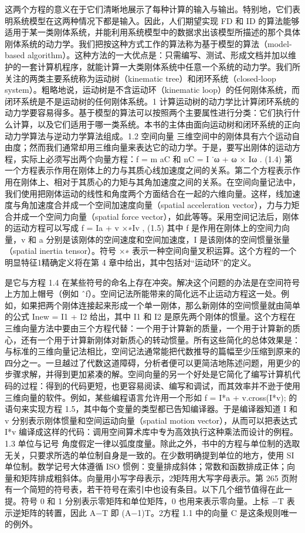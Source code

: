 这两个方程的意义在于它们清晰地展示了每种计算的输入与输出。特别地，它们表明系统模型在这两种情况下都是输入。因此，人们期望实现 FD 和 ID 的算法能够适用于某一类刚体系统，并能利用系统模型中的数据求出该模型所描述的那个具体刚体系统的动力学。我们把按这种方式工作的算法称为基于模型的算法（model-based algorithm）。这种方法的一大优点是：只需编写、测试、形成文档并加以维护的一套计算机程序，就能计算一大类刚体系统中任意一个系统的动力学。我们所关注的两类主要系统称为运动树（kinematic tree）和闭环系统（closed-loop system）。粗略地说，运动树是不含运动环（kinematic loop）的任何刚体系统，而闭环系统是不是运动树的任何刚体系统。1 计算运动树的动力学比计算闭环系统的动力学要容易得多。基于模型的算法可以按照两个主要属性进行分类：它们执行什么计算，以及它们适用于哪一类系统。本书的主体由面向运动树和闭环系统的正向动力学算法与逆动力学算法组成。1.2 空间向量 三维空间中的刚体具有六个运动自由度；然而我们通常却用三维向量来表达它的动力学。于是，要写出刚体的运动方程，实际上必须写出两个向量方程：f = m aC 和 nC = I ˙ω + ω × Iω . (1.4) 第一个方程表示作用在刚体上的力与其质心线加速度之间的关系。第二个方程表示作用在刚体上、相对于其质心的力矩与其角加速度之间的关系。在空间向量记法中，我们使用把刚体运动的线性和角度两个方面结合在一起的六维向量。这样，线加速度与角加速度合并成一个空间加速度向量（spatial acceleration vector），力与力矩合并成一个空间力向量（spatial force vector），如此等等。采用空间记法后，刚体的运动方程可以写成 f = Ia + v ×∗Iv , (1.5) 其中 f 是作用在刚体上的空间力向量，v 和 a 分别是该刚体的空间速度和空间加速度，I 是该刚体的空间惯量张量（spatial inertia tensor）。符号 ×∗ 表示一种空间向量叉积运算。这个方程的一个明显特征1精确定义将在第 4 章中给出，其中包括对“运动环”的定义。

是它与方程 1.4 在某些符号的命名上存在冲突。解决这个问题的办法是在空间符号上方加上帽号（例如 ˆf）。空间记法所能带来的简化远不止运动方程这一处。例如，如果把两个刚体连接起来形成一个单一刚体，那么新刚体的空间惯量就由简单的公式 Inew = I1 + I2 给出，其中 I1 和 I2 是原先两个刚体的惯量。这个方程在三维向量方法中要由三个方程代替：一个用于计算新的质量，一个用于计算新的质心，还有一个用于计算新刚体对新质心的转动惯量。所有这些简化的总体效果是：与标准的三维向量记法相比，空间记法通常能把代数推导的篇幅至少压缩到原来的四分之一。一旦越过了代数这道障碍，分析者便可以更简洁地陈述问题，用更少的步骤求解，并得到更加紧凑的解。空间向量的另一个好处是它简化了编写计算机代码的过程：得到的代码更短，也更容易阅读、编写和调试，而其效率并不逊于使用三维向量的软件。例如，某些编程语言允许用一个形如 f = I*a + v.cross(I*v); 的语句来实现方程 1.5，其中每个变量的类型都已告知编译器。于是编译器知道 I 和 v 分别表示刚体惯量和空间运动向量（spatial motion vector），从而可以把表达式 I*v 编译成这样的代码：调用空间算术库中专为高效执行这种乘法而设计的例程。1.3 单位与记号 角度假定一律以弧度度量。除此之外，书中的方程与单位制的选取无关，只要求所选的单位制自身是一致的。在少数明确提到单位的地方，使用 SI 单位制。数学记号大体遵循 ISO 惯例：变量排成斜体；常数和函数排成正体；向量和矩阵排成粗斜体。向量用小写字母表示，2矩阵用大写字母表示。第 265 页附有一个简短的符号表，若干符号在索引中也设有条目。以下几个细节值得在此一提。符号 0 和 1 分别表示零矩阵和单位矩阵，0 也用来表示零向量。上标 −T 表示逆矩阵的转置，因此 A−T 即 (A−1)T。2方程 1.1 中的向量 C 是这条规则唯一的例外。

